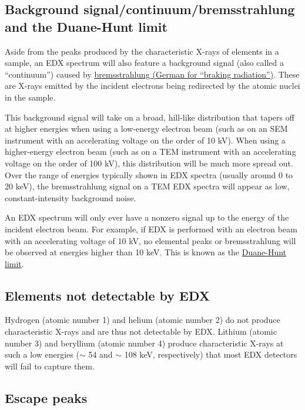 \documentclass[letterpaper, 12pt]{article}
\begin{document}
\subsection*{Background signal/continuum/bremsstrahlung and the Duane-Hunt limit}

Aside from the peaks produced by the characteristic X-rays of elements in a sample, an EDX spectrum will also feature a background signal (also called a ``continuum'') caused by \href{https://en.wikipedia.org/wiki/Bremsstrahlung}{bremsstrahlung (German for ``braking radiation'')}. These are X-rays emitted by the incident electrons being redirected by the atomic nuclei in the sample.

This background signal will take on a broad, hill-like distribution that tapers off at higher energies when using a low-energy electron beam (such as on an SEM instrument with an accelerating voltage on the order of 10 kV). When using a higher-energy electron beam (such as on a TEM instrument with an accelerating voltage on the order of 100 kV), this distribution will be much more spread out. Over the range of energies typically shown in EDX spectra (usually around 0 to 20 keV), the bremsstrahlung signal on a TEM EDX spectra will appear as low, constant-intensity background noise.

An EDX spectrum will only ever have a nonzero signal up to the energy of the incident electron beam. For example, if EDX is performed with an electron beam with an accelerating voltage of 10 kV, no elemental peaks or bremsstrahlung will be observed at energies higher than 10 keV. This is known as the \href{https://en.wikipedia.org/wiki/Duane%E2%80%93Hunt_law}{Duane-Hunt limit}.

\subsection*{Elements not detectable by EDX}

Hydrogen (atomic number 1) and helium (atomic number 2) do not produce characteristic X-rays and are thus not detectable by EDX. Lithium (atomic number 3) and beryllium (atomic number 4) produce characteristic X-rays at such a low energies ($\sim$ 54 and $\sim$ 108 keV, respectively) that most EDX detectors will fail to capture them.

\subsection*{Escape peaks}
\end{document}
